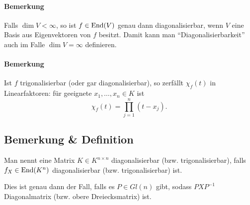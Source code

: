 \paragraph{Bemerkung}
	Falls $ \dim V<\infty $, so ist $ f\in\operatorname{End}(V) $ genau dann diagonalisierbar, wenn $ V $ eine Basis aus Eigenvektoren von $ f $ besitzt. Damit kann man "`Diagonalisierbarkeit"' auch im Falle $ \dim V=\infty $ definieren.
\paragraph{Bemerkung}
	Ist $ f $ trigonalisierbar (oder gar diagonalisierbar), so zerfällt $ \chi_f (t) $ in Linearfaktoren: für geeignete $ x_1,\dots,x_n\in K $ ist
		\[ \chi_f(t)=\prod_{j=1}^{n}(t-x_j). \]
\subsection{Bemerkung \& Definition}
	Man nennt eine Matrix $ K\in K^{n\times n} $ diagonalisierbar (bzw. trigonalisierbar), falls $ f_X\in \operatorname{End}(K^n) $ diagonalisierbar (bzw. trigonalisierbar) ist.
	
	Dies ist genau dann der Fall, falls es $ P\in Gl(n) $ gibt, sodass $ PXP^{-1} $ Diagonalmatrix (bzw. obere Dreiecksmatrix) ist.